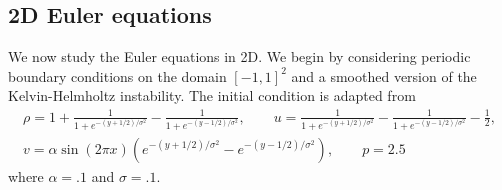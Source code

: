 \documentclass[preprint,10pt]{elsarticle}
\theoremstyle{definition}
\theoremstyle{lemma}
\theoremstyle{theorem}
\theoremstyle{assumption}
\newcommand{\LRp}[1]{\left( #1 \right)}
\newcommand{\note}[1]{{\color{blue}{#1}}}
\begin{document}





\subsection{2D Euler equations}

We now study the Euler equations in 2D.  We begin by considering periodic boundary conditions on the domain $[-1,1]^2$ and a smoothed version of the Kelvin-Helmholtz instability.  The initial condition is adapted from \cite{munz1989numerical, maboudi2018conservative}
\begin{gather*}
\rho = 1 + \frac{1}{1+e^{-(y+1/2)/\sigma^2}} - \frac{1}{1+e^{-(y-1/2)/\sigma^2}}, \qquad
u =  \frac{1}{1+e^{-(y+1/2)/\sigma^2}} - \frac{1}{1+e^{-(y-1/2)/\sigma^2}} - \frac{1}{2}, \\
v = \alpha\sin(2\pi x) \LRp{e^{-(y+1/2)/\sigma^2} - e^{-(y-1/2)/\sigma^2}},\qquad
p = 2.5
\end{gather*}
where $\alpha = .1$ and $\sigma = .1$.  
\end{document}
